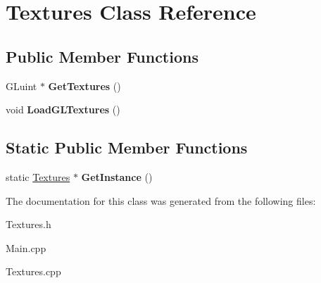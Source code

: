 \hypertarget{class_textures}{\section{Textures Class Reference}
\label{class_textures}
}
\subsection*{Public Member Functions}
\begin{DoxyCompactItemize}
\item 
\hypertarget{class_textures_a2eccc3b8d43e96e65af1b063fe642dc0}{G\+Luint $\ast$ {\bfseries Get\+Textures} ()}\label{class_textures_a2eccc3b8d43e96e65af1b063fe642dc0}

\item 
\hypertarget{class_textures_a130496e6fdd0da614bd4733cc18bb19f}{void {\bfseries Load\+G\+L\+Textures} ()}\label{class_textures_a130496e6fdd0da614bd4733cc18bb19f}

\end{DoxyCompactItemize}
\subsection*{Static Public Member Functions}
\begin{DoxyCompactItemize}
\item 
\hypertarget{class_textures_a3e5839f0cee717b4c7808a49ad9cf040}{static \hyperlink{class_textures}{Textures} $\ast$ {\bfseries Get\+Instance} ()}\label{class_textures_a3e5839f0cee717b4c7808a49ad9cf040}

\end{DoxyCompactItemize}


The documentation for this class was generated from the following files\+:\begin{DoxyCompactItemize}
\item 
Textures.\+h\item 
Main.\+cpp\item 
Textures.\+cpp\end{DoxyCompactItemize}
